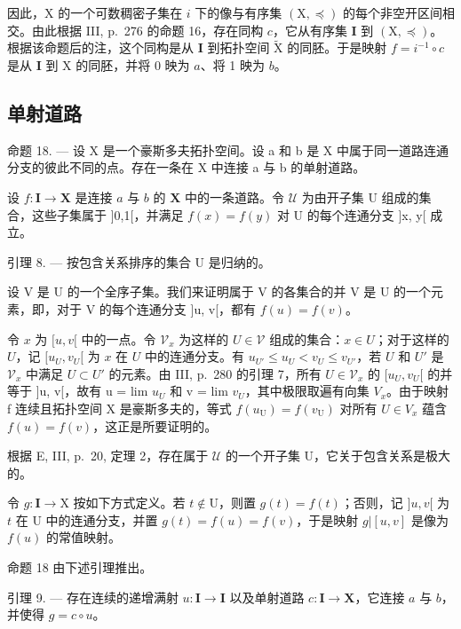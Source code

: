 因此，X 的一个可数稠密子集在 \(i\) 下的像与有序集 \((\mathrm{X}, \preccurlyeq)\) 的每个非空开区间相交。由此根据 III, p.~276 的命题 16，存在同构 \(c\)，它从有序集 \(\mathbf{I}\) 到 \((\mathrm{X}, \preccurlyeq)\)。根据该命题后的注，这个同构是从 \(\mathbf{I}\) 到拓扑空间 \(\widetilde{\mathrm{X}}\) 的同胚。于是映射 \(f = i^{-1} \circ c\) 是从 \(\mathbf{I}\) 到 X 的同胚，并将 0 映为 \(a\)、将 1 映为 \(b\)。

\subsection{单射道路}

命题 18. --- 设 X 是一个豪斯多夫拓扑空间。设 a 和 b 是 X 中属于同一道路连通分支的彼此不同的点。存在一条在 X 中连接 a 与 b 的单射道路。

设 \(f \colon \mathbf{I} \to \mathbf{X}\) 是连接 \(a\) 与 \(b\) 的 \(\mathbf{X}\) 中的一条道路。令 \(\mathcal{U}\) 为由开子集 \(\mathrm{U}\) 组成的集合，这些子集属于 {]}0,1{[}，并满足 \(f(x) = f(y)\) 对 U 的每个连通分支 {]}x, y{[} 成立。

引理 8. --- 按包含关系排序的集合 U 是归纳的。

设 V 是 U 的一个全序子集。我们来证明属于 V 的各集合的并 V 是 U 的一个元素，即，对于 V 的每个连通分支 {]}u, v{[}，都有 \(f(u) = f(v)\)。

令 \(x\) 为 \([u, v[\) 中的一点。令 \(\mathcal{V}_x\) 为这样的 \(U \in \mathcal{V}\) 组成的集合：\(x \in U\)；对于这样的 \(U\)，记 \([u_U, v_U[\) 为 \(x\) 在 \(U\) 中的连通分支。有 \(u_{U'} \leqslant u_U < v_U \leqslant v_{U'}\)，若 \(U\) 和 \(U'\) 是 \(\mathcal{V}_x\) 中满足 \(U \subset U'\) 的元素。由 III, p.~280 的引理 7，所有 \(U \in \mathcal{V}_x\) 的 \([u_U, v_U[\) 的并等于 {]}u, v{[}，故有 u = lim \(u_{U}\) 和 v = lim \(v_{U}\)，其中极限取遍有向集 \(V_{x}\)。由于映射 f 连续且拓扑空间 X 是豪斯多夫的，等式 \(f(u_{\mathrm{U}}) = f(v_{\mathrm{U}})\) 对所有 \(U \in V_{x}\) 蕴含 \(f(u) = f(v)\)，这正是所要证明的。

根据 E, III, p.~20, 定理 2，存在属于 \(\mathcal{U}\) 的一个开子集 U，它关于包含关系是极大的。

令 \(g \colon \mathbf{I} \to \mathrm{X}\) 按如下方式定义。若 \(t \notin \mathrm{U}\)，则置 \(g(t) = f(t)\)；否则，记 \(]u, v[\) 为 \(t\) 在 \(\mathrm{U}\) 中的连通分支，并置 \(g(t) = f(u) = f(v)\)，于是映射 \(g|[u, v]\) 是像为 \(f(u)\) 的常值映射。

命题 18 由下述引理推出。

引理 9. --- 存在连续的递增满射 \(u\colon\mathbf{I}\to\mathbf{I}\) 以及单射道路 \(c\colon\mathbf{I}\to\mathbf{X}\)，它连接 \(a\) 与 \(b\)，并使得 \(g=c\circ u\)。

